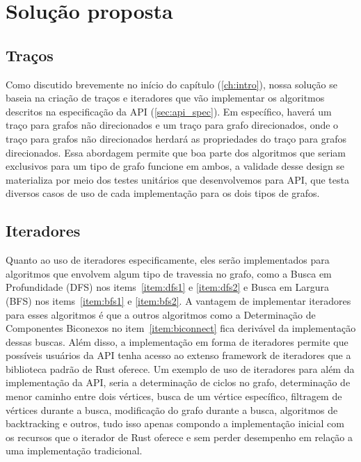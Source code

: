 \section{Solução proposta}

\subsection{Traços}

Como discutido brevemente no início do capítulo (\ref{ch:intro}),
nossa solução se baseia na criação de traços e iteradores que vão
implementar os algoritmos descritos na especificação da API
(\ref{sec:api_spec}). Em específico, haverá um traço para grafos não
direcionados e um traço para grafo direcionados, onde o traço para
grafos não direcionados herdará as propriedades do traço para grafos
direcionados. Essa abordagem permite que boa parte dos algoritmos
que seriam exclusivos para um tipo de grafo funcione em ambos, a
validade desse design se materializa por meio dos testes unitários
que desenvolvemos para API, que testa diversos casos de uso de cada
implementação para os dois tipos de grafos.

\subsection{Iteradores}

Quanto ao uso de iteradores especificamente, eles serão implementados
para algoritmos que envolvem algum tipo de travessia no grafo, como a
Busca em Profundidade (DFS) nos items~\ref{item:dfs1} e \ref{item:dfs2} e
Busca em Largura (BFS) nos items~\ref{item:bfs1} e \ref{item:bfs2}. A
vantagem de implementar iteradores para esses algoritmos é que a
outros algoritmos como a Determinação de Componentes Biconexos no
item~\ref{item:biconnect} fica derivável da implementação dessas
buscas. Além disso, a implementação em forma de iteradores permite
que possíveis usuários da API tenha acesso ao extenso framework de iteradores
que a biblioteca padrão de Rust oferece. Um exemplo de uso de
iteradores para além da implementação da API, seria a determinação de
ciclos no grafo, determinação de menor caminho entre dois vértices,
busca de um vértice específico, filtragem de vértices durante a
busca, modificação do grafo durante a busca, algoritmos de
backtracking e outros, tudo isso apenas compondo a implementação
inicial com os recursos que o iterador de Rust oferece e sem perder
desempenho em relação a uma implementação tradicional.


